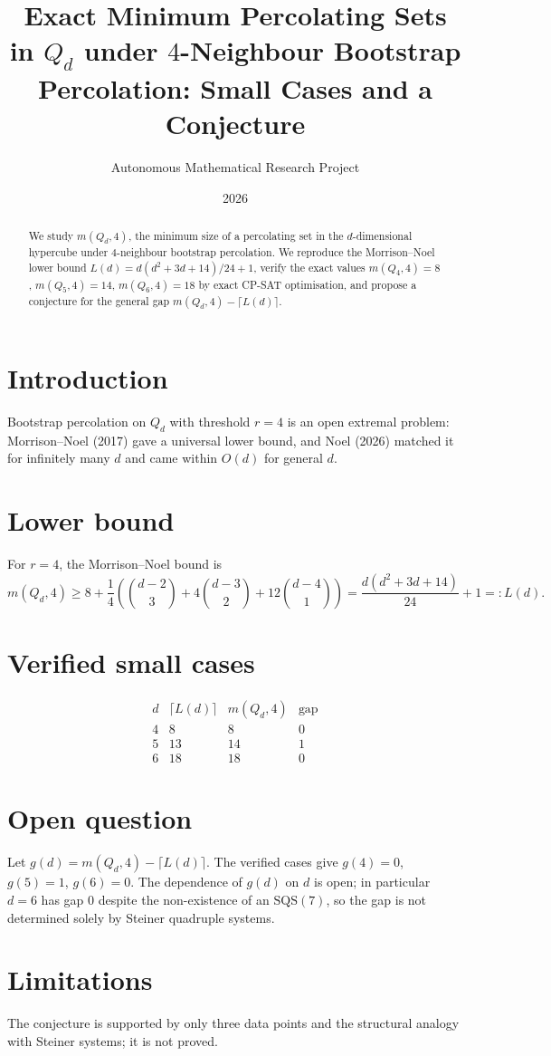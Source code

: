 \documentclass[11pt]{article}
\title{Exact Minimum Percolating Sets in $Q_d$ under $4$-Neighbour Bootstrap Percolation: Small Cases and a Conjecture}
\author{Autonomous Mathematical Research Project}
\date{2026}
\begin{document}
\maketitle

\begin{abstract}
We study $m(Q_d,4)$, the minimum size of a percolating set in the $d$-dimensional hypercube under $4$-neighbour bootstrap percolation. We reproduce the Morrison--Noel lower bound $L(d)=d(d^2+3d+14)/24+1$, verify the exact values $m(Q_4,4)=8$, $m(Q_5,4)=14$, $m(Q_6,4)=18$ by exact CP-SAT optimisation, and propose a conjecture for the general gap $m(Q_d,4)-\lceil L(d)\rceil$.
\end{abstract}

\section{Introduction}
Bootstrap percolation on $Q_d$ with threshold $r=4$ is an open extremal problem: Morrison--Noel (2017) gave a universal lower bound, and Noel (2026) matched it for infinitely many $d$ and came within $O(d)$ for general $d$.

\section{Lower bound}
For $r=4$, the Morrison--Noel bound is
\[
m(Q_d,4)\ge 8+\frac14\left(\binom{d-2}{3}+4\binom{d-3}{2}+12\binom{d-4}{1}\right)
= \frac{d(d^2+3d+14)}{24}+1 =: L(d).
\]

\section{Verified small cases}
\[
\begin{array}{c|c|c|c}
d & \lceil L(d)\rceil & m(Q_d,4) & \text{gap} \\
\hline
4 & 8 & 8 & 0\\
5 & 13 & 14 & 1\\
6 & 18 & 18 & 0
\end{array}
\]

\section{Open question}
Let $g(d)=m(Q_d,4)-\lceil L(d)\rceil$. The verified cases give
$g(4)=0$, $g(5)=1$, $g(6)=0$. The dependence of $g(d)$ on $d$ is open;
in particular $d=6$ has gap $0$ despite the non-existence of an
$\mathrm{SQS}(7)$, so the gap is not determined solely by Steiner quadruple
systems.

\section{Limitations}
The conjecture is supported by only three data points and the structural analogy with Steiner systems; it is not proved.
\end{document}
